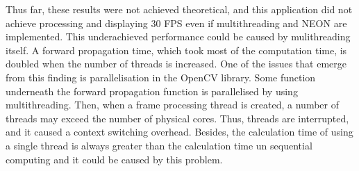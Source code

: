     Thus far, these results were not achieved theoretical,
    and this application did not achieve processing and displaying 30 FPS even if
    multithreading and NEON are implemented.
    This underachieved performance could be caused by mulithreading itself.
    A forward propagation time, which took most of the computation time, is doubled when the number of threads is increased.
        One of the issues that emerge from this finding is parallelisation in the OpenCV library.
        Some function underneath the forward propagation function is parallelised by using multithreading.
        Then, when a frame processing thread is created, a number of threads may exceed the number of physical cores.
        Thus, threads are interrupted, and it caused a context switching overhead.
    Besides, the calculation time of using a single thread is always greater than
    the calculation time un sequential computing and it could be caused by this problem.